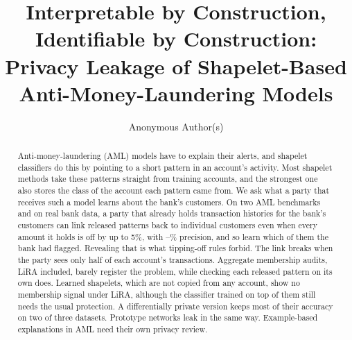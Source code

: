 \documentclass[sigconf,anonymous]{acmart}
\begin{document}
\title{Interpretable by Construction, Identifiable by Construction:\\Privacy Leakage of Shapelet-Based Anti-Money-Laundering Models}
\author{Anonymous Author(s)}

\begin{abstract}
Anti-money-laundering (AML) models have to explain their alerts, and shapelet classifiers do this by pointing to a short pattern in an account's activity. Most shapelet methods take these patterns straight from training accounts, and the strongest one also stores the class of the account each pattern came from. We ask what a party that receives such a model learns about the bank's customers. On two AML benchmarks and on real bank data, a party that already holds transaction histories for the bank's customers can link released patterns back to individual customers even when every amount it holds is off by up to 5\%, with \realPrec--\berkaRealPrec\% precision, and so learn which of them the bank had flagged. Revealing that is what tipping-off rules forbid. The link breaks when the party sees only half of each account's transactions. Aggregate membership audits, LiRA included, barely register the problem, while checking each released pattern on its own does. Learned shapelets, which are not copied from any account, show no membership signal under LiRA, although the classifier trained on top of them still needs the usual protection. A differentially private version keeps most of their accuracy on two of three datasets. Prototype networks leak in the same way. Example-based explanations in AML need their own privacy review.
\end{abstract}


\maketitle
\end{document}
